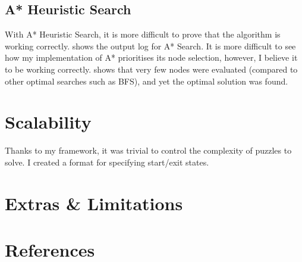 \documentclass[a4paper]{article}
\begin{document}
\subsection{A* Heuristic Search}
With A* Heuristic Search, it is more difficult to prove that the algorithm is working correctly.
 shows the output log for A* Search.
It is more difficult to see how my implementation of A* prioritises its node selection, however, I believe it to be working correctly.
 shows that very few nodes were evaluated (compared to other optimal searches such as BFS), and yet the optimal solution was found.

\section{Scalability}
Thanks to my framework, it was trivial to control the complexity of puzzles to solve.
I created a format for specifying start/exit states.



\section{Extras \& Limitations}

\section{References}
\end{document}
